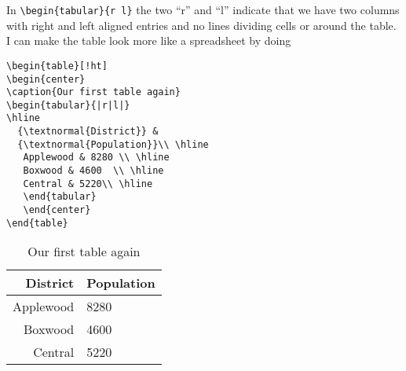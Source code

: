 In \verb|\begin{tabular}{r l}| the two ``r'' and ``l'' indicate that we have two columns with right and left aligned entries and no lines dividing cells or around the table. I can make the table look more like a spreadsheet by doing
\begin{singlespace}\small
\begin{verbatim}
\begin{table}[!ht]
\begin{center}
\caption{Our first table again}
\begin{tabular}{|r|l|}
\hline
  {\textnormal{District}} &  
  {\textnormal{Population}}\\ \hline
   Applewood & 8280 \\ \hline
   Boxwood & 4600  \\ \hline
   Central & 5220\\ \hline
   \end{tabular}
   \end{center}
\end{table}
\end{verbatim}
\end{singlespace}
\begin{table}[!ht]
\begin{center}
\caption{Our first table again}
\begin{tabular}{|r|l|}
\hline
  {\textnormal{District}} &  
  {\textnormal{Population}}\\ \hline
   Applewood & 8280 \\ \hline
   Boxwood & 4600  \\ \hline
   Central & 5220\\ \hline
   \end{tabular}
   \end{center}
\end{table}

